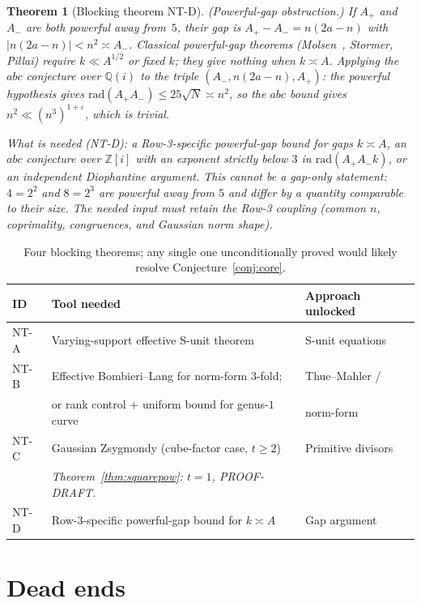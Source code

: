 \documentclass[12pt]{amsart}
\theoremstyle{plain}
\newtheorem{theorem}{Theorem}[section]
\theoremstyle{definition}
\theoremstyle{remark}
\newcommand{\QQ}{\mathbb{Q}}
\newcommand{\Zi}{\mathbb{Z}[i]}
\newcommand{\Aplus}{A_{+}}
\newcommand{\Aminus}{A_{-}}
\begin{document}
\begin{theorem}[Blocking theorem NT-D]
\label{thm:NTD}
\textup{(Powerful-gap obstruction.)}
If $\Aplus$ and $\Aminus$ are both powerful away from~$5$, their gap is
$\Aplus-\Aminus = n(2a-n)$ with $|n(2a-n)|<n^2\asymp\Aminus$.
Classical powerful-gap theorems (Molsen~\cite{Molsen1939},
Stormer, Pillai) require $k\ll A^{1/2}$ or fixed $k$; they give
nothing when $k\asymp A$.
Applying the $abc$ conjecture over $\QQ(i)$ to the triple
$(\Aminus, n(2a-n), \Aplus)$: the powerful hypothesis gives
$\mathrm{rad}(\Aplus\Aminus)\leq 25\sqrt{N}\asymp n^2$,
so the $abc$ bound gives $n^2\ll (n^3)^{1+\varepsilon}$,
which is trivial.

\medskip
\noindent\emph{What is needed} \textup{(NT-D)}: a Row-3-specific
powerful-gap bound for gaps $k\asymp A$, an $abc$ conjecture over $\Zi$
with an exponent strictly below $3$ in $\mathrm{rad}(\Aplus\Aminus k)$,
or an independent Diophantine argument. This cannot be a gap-only statement:
$4=2^2$ and $8=2^3$ are powerful away from $5$ and differ by a quantity comparable
to their size. The needed input must retain the Row-3 coupling (common $n$,
coprimality, congruences, and Gaussian norm shape).
\end{theorem}

\begin{table}[h]
\centering
\caption{Four blocking theorems; any single one unconditionally proved
  would likely resolve Conjecture~\ref{conj:core}.}
\label{tab:blocking}%
\begin{tabular}{lll}
\toprule
ID & Tool needed & Approach unlocked \\
\midrule
NT-A & Varying-support effective S-unit theorem & S-unit equations \\
NT-B & Effective Bombieri--Lang for norm-form $3$-fold;
  & Thue--Mahler / \\
& or rank control + uniform bound for genus-$1$ curve & norm-form \\
NT-C & Gaussian Zsygmondy (cube-factor case, $t\geq2$) & Primitive divisors \\
& \emph{Theorem~\ref{thm:squarepow}: $t=1$, PROOF-DRAFT.} & \\
NT-D & Row-3-specific powerful-gap bound for $k\asymp A$ & Gap argument \\
\bottomrule
\end{tabular}
\end{table}

\section{Dead ends}
\label{sec:deadends}%
\end{document}
